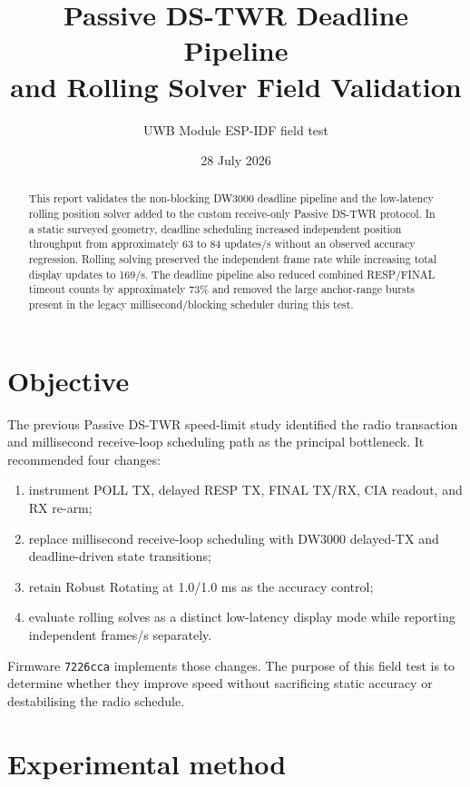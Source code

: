 \documentclass[11pt,a4paper]{article}
\title{Passive DS-TWR Deadline Pipeline\\and Rolling Solver Field Validation}
\author{UWB Module ESP-IDF field test}
\date{28 July 2026}
\begin{document}
\maketitle

\begin{abstract}
This report validates the non-blocking DW3000 deadline pipeline and the
low-latency rolling position solver added to the custom receive-only Passive
DS-TWR protocol. In a static surveyed geometry, deadline scheduling increased
independent position throughput from approximately 63 to 84 updates/s without
an observed accuracy regression. Rolling solving preserved the independent
frame rate while increasing total display updates to 169/s. The deadline
pipeline also reduced combined RESP/FINAL timeout counts by approximately
73\% and removed the large anchor-range bursts present in the legacy
millisecond/blocking scheduler during this test.
\end{abstract}

\section{Objective}

The previous Passive DS-TWR speed-limit study identified the radio transaction
and millisecond receive-loop scheduling path as the principal bottleneck. It
recommended four changes:
\begin{enumerate}[itemsep=2pt,topsep=3pt]
\item instrument POLL TX, delayed RESP TX, FINAL TX/RX, CIA readout, and RX
re-arm;
\item replace millisecond receive-loop scheduling with DW3000 delayed-TX and
deadline-driven state transitions;
\item retain Robust Rotating at 1.0/1.0 ms as the accuracy control;
\item evaluate rolling solves as a distinct low-latency display mode while
reporting independent frames/s separately.
\end{enumerate}

Firmware \texttt{7226cca} implements those changes. The purpose of this field
test is to determine whether they improve speed without sacrificing static
accuracy or destabilising the radio schedule.

\section{Experimental method}
\end{document}
